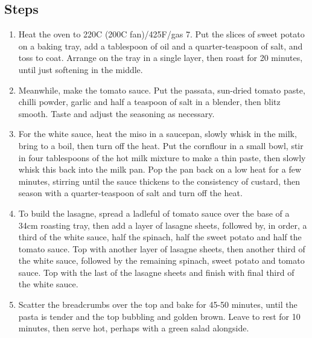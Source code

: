 \documentclass{book}
\begin{document}
\subsection*{Steps}
\begin{enumerate}
\item Heat the oven to 220C (200C fan)/425F/gas 7. Put the slices of sweet potato on a baking tray, add a tablespoon of oil and a quarter-teaspoon of salt, and toss to coat. Arrange on the tray in a single layer, then roast for 20 minutes, until just softening in the middle.
\item Meanwhile, make the tomato sauce. Put the passata, sun-dried tomato paste, chilli powder, garlic and half a teaspoon of salt in a blender, then blitz smooth. Taste and adjust the seasoning as necessary.
\item For the white sauce, heat the miso in a saucepan, slowly whisk in the milk, bring to a boil, then turn off the heat. Put the cornflour in a small bowl, stir in four tablespoons of the hot milk mixture to make a thin paste, then slowly whisk this back into the milk pan. Pop the pan back on a low heat for a few minutes, stirring until the sauce thickens to the consistency of custard, then season with a quarter-teaspoon of salt and turn off the heat.
\item To build the lasagne, spread a ladleful of tomato sauce over the base of a 34cm roasting tray, then add a layer of lasagne sheets, followed by, in order, a third of the white sauce, half the spinach, half the sweet potato and half the tomato sauce. Top with another layer of lasagne sheets, then another third of the white sauce, followed by the remaining spinach, sweet potato and tomato sauce. Top with the last of the lasagne sheets and finish with final third of the white sauce.
\item Scatter the breadcrumbs over the top and bake for 45-50 minutes, until the pasta is tender and the top bubbling and golden brown. Leave to rest for 10 minutes, then serve hot, perhaps with a green salad alongside.
\end{enumerate}
\newpage
\end{document}
